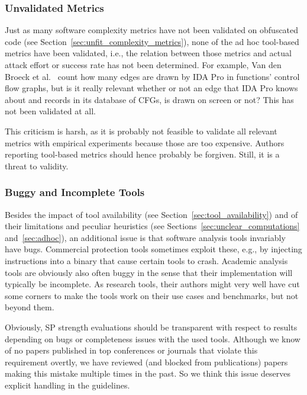 \subsubsection{Unvalidated Metrics}
\label{unvalidated_metrics}
Just as many software complexity metrics have not been validated on obfuscated code (see Section~\ref{sec:unfit_complexity_metrics}), none of the ad hoc tool-based metrics have been validated, i.e., the relation between those metrics and actual attack effort or success rate has not been determined. For example, Van den Broeck et al.~\cite{jens21} count how many edges are drawn by IDA Pro in functions' control flow graphs, but is it really relevant whether or not an edge that IDA Pro knows about and records in its database of CFGs, is drawn on screen or not? This has not been validated at all. 

This criticism is harsh, as it is probably not feasible to validate all relevant metrics with empirical experiments because those are too expensive. Authors reporting tool-based metrics should hence probably be forgiven. Still, it is a threat to validity. 

\subsubsection{Buggy and Incomplete Tools}
\label{sec:buggy_tools}
Besides the impact of tool availability (see Section~\ref{sec:tool_availability}) and of their limitations and peculiar heuristics (see Sections~\ref{sec:unclear_computations} and~\ref{sec:adhoc}), an additional issue is that software analysis tools invariably have bugs. Commercial protection tools sometimes exploit these, e.g., by injecting instructions into a binary that cause certain tools to crash. Academic analysis tools are obviously also often buggy in the sense that their implementation will typically be incomplete. As research tools, their authors might very well have cut some corners to make the tools work on their use cases and benchmarks, but not beyond them. 

Obviously, SP strength evaluations should be transparent with respect to results depending on bugs or completeness issues with the used tools. Although we know of no papers published in top conferences or journals that violate this requirement overtly, we have reviewed (and blocked from publications) papers making this mistake multiple times in the past. So we think this issue deserves explicit handling in the guidelines. 

